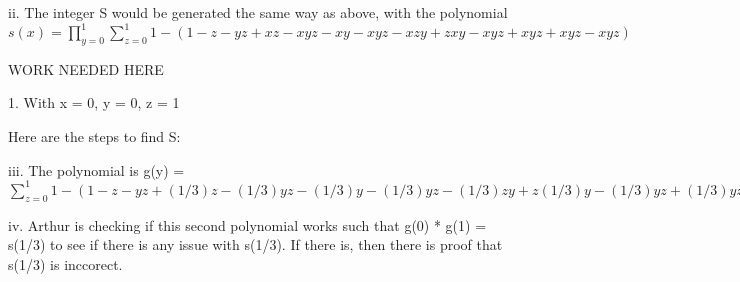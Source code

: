 \documentclass[12pt]{article}
\begin{document}
\vskip 0.3cm

ii. The integer S would be generated the same way as above,
with the polynomial $s(x) = \prod_{y=0}^{1}\sum_{z=0}^{1} 1 - (1 - z - yz + xz - xyz - xy - xyz - xzy + zxy - xyz + xyz + xyz - xyz)$

\vskip 0.3cm
WORK NEEDED HERE

1. With x = 0, y = 0, z = 1

\vskip 0.3cm
Here are the steps to find S:

\vskip 0.3cm

iii. The polynomial is g(y) =  $\sum_{z=0}^{1} 1 - (1 - z - yz + (1/3)z - (1/3)yz - (1/3)y - (1/3)yz - (1/3)zy + z(1/3)y - (1/3)yz + (1/3)yz + (1/3)yz - (1/3)yz)$

\vskip 0.3cm

iv.  Arthur is checking if this second polynomial works such that g(0) * g(1) = s(1/3)
to see if there is any issue with s(1/3). If there is, then there is proof that
s(1/3) is inccorect.
\end{document}
